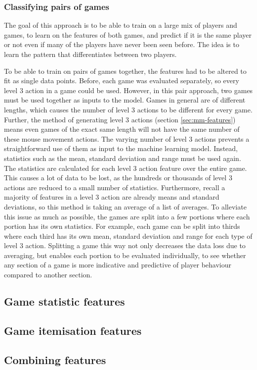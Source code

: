 \documentclass[Report.tex]{subfiles}
\begin{document}
\subsubsection{Classifying pairs of games}
The goal of this approach is to be able to train on a large mix of players and games, to learn on the features of both games, and predict if it is the same player or not even if many of the players have never been seen before. The idea is to learn the pattern that differentiates between two players. 

To be able to train on pairs of games together, the features had to be altered to fit as single data points. Before, each game was evaluated separately, so every level 3 action in a game could be used. However, in this pair approach, two games must be used together as inputs to the model. Games in general are of different lengths, which causes the number of level 3 actions to be different for every game. Further, the method of generating level 3 actions (section \ref{sec:mm-features}) means even games of the exact same length will not have the same number of these mouse movement actions. The varying number of level 3 actions prevents a straightforward use of them as input to the machine learning model. Instead, statistics such as the mean, standard deviation and range must be used again. The statistics are calculated for each level 3 action feature over the entire game. This causes a lot of data to be lost, as the hundreds or thousands of level 3 actions are reduced to a small number of statistics. Furthermore, recall a majority of features in a level 3 action are already means and standard deviations, so this method is taking an average of a list of averages. To alleviate this issue as much as possible, the games are split into a few portions where each portion has its own statistics. For example, each game can be split into thirds where each third has its own mean, standard deviation and range for each type of level 3 action. Splitting a game this way not only decreases the data loss due to averaging, but enables each portion to be evaluated individually, to see whether any section of a game is more indicative and predictive of player behaviour compared to another section.

%


\subsection{Game statistic features}

\subsection{Game itemisation features}

\subsection{Combining features}
\end{document}
